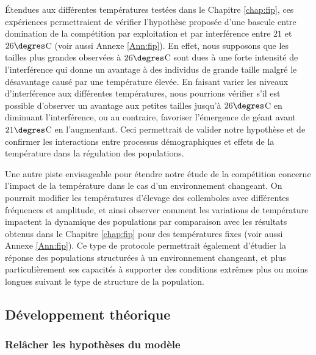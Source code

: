 Étendues aux différentes températures testées dans le Chapitre \ref{chap:fip},
ces expériences permettraient de vérifier l'hypothèse proposée d'une bascule
entre domination de la compétition par exploitation et par interférence entre
$21$ et $26\degres$C (voir aussi Annexe \ref{Ann:fip}). En effet, nous supposons
que les tailles plus grandes observées à $26\degres$C sont dues à une forte
intensité de l'interférence qui donne un avantage à des individus de grande
taille malgré le désavantage causé par une température élevée. En faisant varier
les niveaux d'interférence aux différentes températures, nous pourrions
vérifier s'il est possible d'observer un avantage aux petites tailles jusqu'à
$26\degres$C en diminuant l'interférence, ou au contraire, favoriser l'émergence
de géant avant $21\degres$C en l'augmentant. Ceci permettrait de valider notre
hypothèse et de confirmer les interactions entre processus démographiques et
effets de la température dans la régulation des populations.

Une autre piste envisageable pour étendre notre étude de la compétition
concerne l'impact de la température dans le cas d'un environnement changeant. On
pourrait modifier les températures d'élevage des collemboles avec différentes
fréquences et amplitude, et ainsi observer comment les variations de température
impactent la dynamique des populations par comparaison avec les résultats
obtenus dans le Chapitre \ref{chap:fip} pour des températures fixes (voir aussi
Annexe \ref{Ann:fip}). Ce type de protocole permettrait également d'étudier la
réponse des populations structurées à un environnement changeant, et plus
particulièrement ses capacités à supporter des conditions extrêmes plus ou
moins longues suivant le type de structure de la population.
%

\subsection{Développement théorique}

\subsubsection{Relâcher les hypothèses du modèle}

